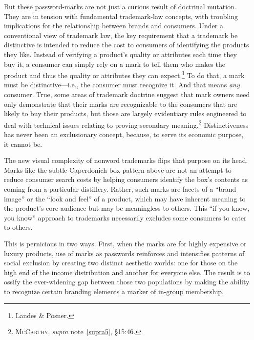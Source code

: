 \documentclass[letterpaper, 11pt, oneside]{article}
\begin{document}
But these password-marks are not just a curious result of doctrinal mutation. They are in tension with fundamental trademark-law concepts, with troubling implications for the relationship between brands and consumers. Under a conventional view of trademark law, the key requirement that a trademark be distinctive is intended to reduce the cost to consumers of identifying the products they like. Instead of verifying a product's quality or attributes each time they buy it, a consumer can simply rely on a mark to tell them who makes the product and thus the quality or attributes they can expect.\footnote{Landes \& Posner.} To do that, a mark must be distinctive—i.e., the consumer must recognize it. And that means \textit{any} consumer. True, some areas of trademark doctrine suggest that mark owners need only demonstrate that their marks are recognizable to the consumers that are likely to buy their products, but those are largely evidentiary rules engineered to deal with technical issues relating to proving secondary meaning.\footnote{\textsc{McCarthy}, \textit{supra} note~\ref{supra5}, \S 15:46.} Distinctiveness has never been an exclusionary concept, because, to serve its economic purpose, it cannot be. 

The new visual complexity of nonword trademarks flips that purpose on its head. Marks like the subtle Caperdonich box pattern above are not an attempt to reduce consumer search costs by helping consumers identify the box's contents as coming from a particular distillery. Rather, such marks are facets of a ``brand image'' or the ``look and feel'' of a product, which may have inherent meaning to the product's core audience but may be meaningless to others. This ``if you know, you know'' approach to trademarks necessarily excludes some consumers to cater to others. 

This is pernicious in two ways. First, when the marks are for highly expensive or luxury products, use of marks as passwords reinforces and intensifies patterns of social exclusion by creating two distinct aesthetic worlds: one for those on the high end of the income distribution and another for everyone else. The result is to ossify the ever-widening gap between those two populations by making the ability to recognize certain branding elements a marker of in-group membership.
\end{document}
